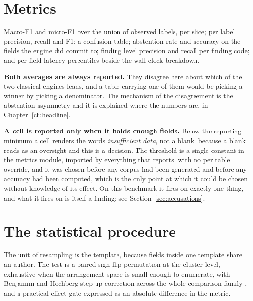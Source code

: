 \section{Metrics}

Macro-F1 and micro-F1 over the union of observed labels, per slice; per label
precision, recall and F1; a confusion table; abstention rate and accuracy on the
fields the engine did commit to; finding level precision and recall per finding
code; and per field latency percentiles beside the wall clock breakdown.

\textbf{Both averages are always reported.} They disagree here about which of
the two classical engines leads, and a table carrying one of them would be
picking a winner by picking a denominator. The mechanism of the disagreement is
the abstention asymmetry and it is explained where the numbers are, in
Chapter~\ref{ch:headline}.

\textbf{A cell is reported only when it holds enough fields.} Below the
reporting minimum a cell renders the words \emph{insufficient data}, not a
blank, because a blank reads as an oversight and this is a decision. The
threshold is a single constant in the metrics module, imported by everything
that reports, with no per table override, and it was chosen before any corpus
had been generated and before any accuracy had been computed, which is the only
point at which it could be chosen without knowledge of its effect. On this
benchmark it fires on exactly one thing, and what it fires on is itself a
finding: see Section~\ref{sec:accusations}.

\section{The statistical procedure}

The unit of resampling is the template, because fields inside one template share
an author. The test is a paired sign flip permutation at the cluster level,
exhaustive when the arrangement space is small enough to enumerate, with
Benjamini and Hochberg step up correction across the whole comparison family
\cite{benjamini1995}, and a practical effect gate expressed as an absolute
difference in the metric.

\begin{table}[htbp]
  \centering
  \caption{The pre-registered statistical policy and the power the realised
  design has. Every value in the upper half was fixed before the runs.}
  \label{tab:design}
  
\end{table}

